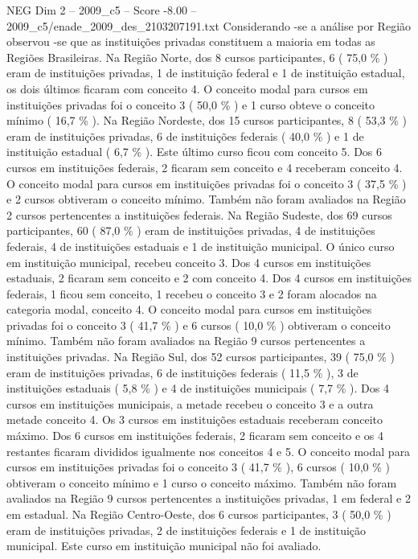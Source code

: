\begin{textsample}{NEG Dim 2 – 2009\_c5 – Score -8.00 – 2009\_c5/enade\_2009\_des\_2103207191.txt}
Considerando -se a análise por Região observou -se que as instituições privadas constituem a maioria em todas as Regiões Brasileiras.
Na Região Norte, dos 8 cursos participantes, 6 ( 75,0 \% ) eram de instituições privadas, 1 de instituição federal e 1 de instituição estadual, os dois últimos ficaram com conceito 4.
O conceito modal para cursos em instituições privadas foi o conceito 3 ( 50,0 \% ) e 1 curso obteve o conceito mínimo ( 16,7 \% ).
Na Região Nordeste, dos 15 cursos participantes, 8 ( 53,3 \% ) eram de instituições privadas, 6 de instituições federais ( 40,0 \% ) e 1 de instituição estadual ( 6,7 \% ).
Este último curso ficou com conceito 5.
Dos 6 cursos em instituições federais, 2 ficaram sem conceito e 4 receberam conceito 4.
O conceito modal para cursos em instituições privadas foi o conceito 3 ( 37,5 \% ) e 2 cursos obtiveram o conceito mínimo.
Também não foram avaliados na Região 2 cursos pertencentes a instituições federais.
Na Região Sudeste, dos 69 cursos participantes, 60 ( 87,0 \% ) eram de instituições privadas, 4 de instituições federais, 4 de instituições estaduais e 1 de instituição municipal.
O único curso em instituição municipal, recebeu conceito 3.
Dos 4 cursos em instituições estaduais, 2 ficaram sem conceito e 2 com conceito 4.
Dos 4 cursos em instituições federais, 1 ficou sem conceito, 1 recebeu o conceito 3 e 2 foram alocados na categoria modal, conceito 4.
O conceito modal para cursos em instituições privadas foi o conceito 3 ( 41,7 \% ) e 6 cursos ( 10,0 \% ) obtiveram o conceito mínimo.
Também não foram avaliados na Região 9 cursos pertencentes a instituições privadas.
Na Região Sul, dos 52 cursos participantes, 39 ( 75,0 \% ) eram de instituições privadas, 6 de instituições federais ( 11,5 \% ), 3 de instituições estaduais ( 5,8 \% ) e 4 de instituições municipais ( 7,7 \% ).
Dos 4 cursos em instituições municipais, a metade recebeu o conceito 3 e a outra metade conceito 4.
Os 3 cursos em instituições estaduais receberam conceito máximo.
Dos 6 cursos em instituições federais, 2 ficaram sem conceito e os 4 restantes ficaram divididos igualmente nos conceitos 4 e 5.
O conceito modal para cursos em instituições privadas foi o conceito 3 ( 41,7 \% ), 6 cursos ( 10,0 \% ) obtiveram o conceito mínimo e 1 curso o conceito máximo.
Também não foram avaliados na Região 9 cursos pertencentes a instituições privadas, 1 em federal e 2 em estadual.
Na Região Centro-Oeste, dos 6 cursos participantes, 3 ( 50,0 \% ) eram de instituições privadas, 2 de instituições federais e 1 de instituição municipal.
Este curso em instituição municipal não foi avaliado.

\end{textsample}
